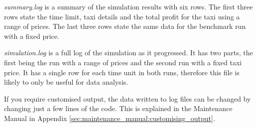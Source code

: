 \textit{summary.log} is a summary of the simulation results with six rows. The
first three rows state the time limit, taxi details and the total profit for
the taxi using a range of prices. The last three rows state the same data for
the benchmark run with a fixed price.

\textit{simulation.log} is a full log of the simulation as it progressed. It
has two parts, the first being the run with a range of prices and the second
run with a fixed taxi price. It has a single row for each time unit in both
runs, therefore this file is likely to only be useful for data analysis.

If you require customised output, the data written to log files can be changed
by changing just a few lines of the code. This is explained in the Maintenance
Manual in Appendix \ref{sec:maintenance_manual:customising_output}.
